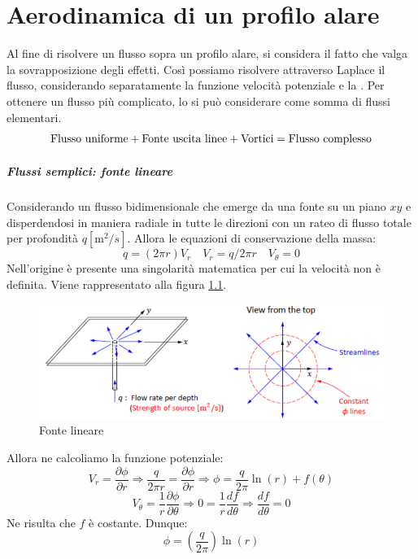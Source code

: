 \chapter{Aerodinamica di un profilo alare}\label{ch:Airfoil}

Al fine di risolvere un flusso sopra un profilo alare, si considera il fatto che valga la sovrapposizione degli effetti.
Così possiamo risolvere attraverso Laplace il flusso, considerando separatamente la funzione velocità potenziale e la .
Per ottenere un flusso più complicato, lo si può considerare come somma di flussi elementari.
\begin{equation}
\textup{Flusso uniforme} + \textup{Fonte uscita linee} + \textup{Vortici} = \textup{Flusso complesso}
\end{equation}

\paragraph{Flussi semplici: fonte lineare}
Considerando un flusso bidimensionale che emerge da una fonte su un piano $xy$ e disperdendosi in maniera radiale in tutte le direzioni con un rateo di flusso totale per profondità $q \left[\unit{\m^2/s}\right]$.
Allora le equazioni di conservazione della massa:
\begin{equation}
q = (2\pi r)V_r \quad V_r = q/2\pi r \quad V_{\theta} =0
\end{equation}
Nell'origine è presente una singolarità matematica per cui la velocità non è definita.
Viene rappresentato alla figura \ref{fig:LinearSource}.

\begin{figure}
\centering
\includegraphics[width = \textwidth]{gfx/LinearSource}
\caption{Fonte lineare}
\label{fig:LinearSource}
\end{figure}

Allora ne calcoliamo la funzione potenziale:
\begin{equation}
V_r = \frac{\partial \phi}{\partial r} \Rightarrow \frac{q}{2\pi r} = \frac{\partial \phi}{\partial r} \Rightarrow \phi = \frac{q}{2\pi}\ln(r) + f(\theta)
\end{equation}
\begin{equation}
V_{\theta} = \frac{1}{r}\frac{\partial \phi}{\partial \theta} \Rightarrow 0 = \frac{1}{r}\frac{df}{d\theta} \Rightarrow \frac{df}{d\theta} = 0
\end{equation}
Ne risulta che $f$ è costante.
Dunque:
\begin{equation}
\phi = \left(\frac{q}{2\pi}\right)\ln(r)
\end{equation}

